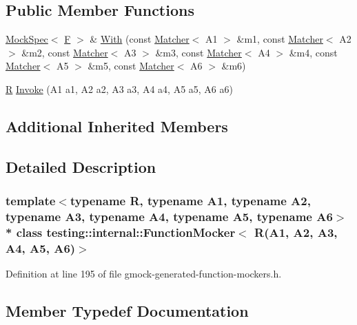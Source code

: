 \subsection*{Public Member Functions}
\begin{DoxyCompactItemize}
\item 
\hyperlink{classtesting_1_1internal_1_1_mock_spec}{Mock\+Spec}$<$ \hyperlink{classtesting_1_1internal_1_1_function_mocker_3_01_r_07_a1_00_01_a2_00_01_a3_00_01_a4_00_01_a5_00_01_a6_08_4_a5373cd66051f0a54e83b0497004df058}{F} $>$ \& \hyperlink{classtesting_1_1internal_1_1_function_mocker_3_01_r_07_a1_00_01_a2_00_01_a3_00_01_a4_00_01_a5_00_01_a6_08_4_ab34f4d748a5a2fb68d6d27d963572c03}{With} (const \hyperlink{classtesting_1_1_matcher}{Matcher}$<$ A1 $>$ \&m1, const \hyperlink{classtesting_1_1_matcher}{Matcher}$<$ A2 $>$ \&m2, const \hyperlink{classtesting_1_1_matcher}{Matcher}$<$ A3 $>$ \&m3, const \hyperlink{classtesting_1_1_matcher}{Matcher}$<$ A4 $>$ \&m4, const \hyperlink{classtesting_1_1_matcher}{Matcher}$<$ A5 $>$ \&m5, const \hyperlink{classtesting_1_1_matcher}{Matcher}$<$ A6 $>$ \&m6)
\item 
\hyperlink{typedefs__9_8js_afb423b73ee7b6c04d2d54fc06e405404}{R} \hyperlink{classtesting_1_1internal_1_1_function_mocker_3_01_r_07_a1_00_01_a2_00_01_a3_00_01_a4_00_01_a5_00_01_a6_08_4_a8499277f15101fefacbb0c9d93b8153b}{Invoke} (A1 a1, A2 a2, A3 a3, A4 a4, A5 a5, A6 a6)
\end{DoxyCompactItemize}
\subsection*{Additional Inherited Members}


\subsection{Detailed Description}
\subsubsection*{template$<$typename R, typename A1, typename A2, typename A3, typename A4, typename A5, typename A6$>$\\*
class testing\+::internal\+::\+Function\+Mocker$<$ R(\+A1, A2, A3, A4, A5, A6)$>$}



Definition at line 195 of file gmock-\/generated-\/function-\/mockers.\+h.



\subsection{Member Typedef Documentation}
